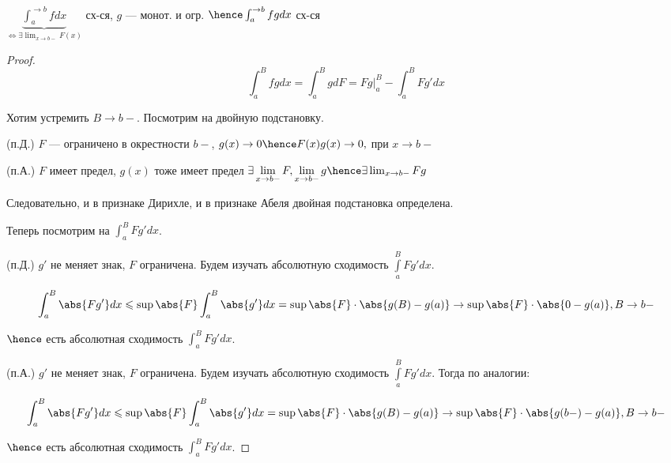 \begin{theorem}
    $\underbrace{\int_a^{\to b} f dx}_{\Leftrightarrow \exists \lim_{x \to b-} F(x)}$ сх-ся, $g$ --- монот. и огр. $\hence \int_a^{\to b} fg dx $ сх-ся
\end{theorem}


\begin{proof}
    \[
        \int_a^B fg dx = \int_a^B g dF = Fg \bigg| _a ^ B - \int_a^B F g' dx 
    \]

    Хотим устремить $B \to b-$. Посмотрим на двойную подстановку.
    
    (п.Д.) $F$ --- ограничено в окрестности $b-$, $g(x) \to 0 \hence F(x)g(x) \to 0, $ при $x \to b-$

    (п.А.) $F$ имеет предел, $g(x)$ тоже имеет предел $\exists \lim\limits_{x \to b-} F, \lim\limits_{x  \to b-} g \hence \exists \lim_{x\to b-} Fg$

    Следовательно, и в признаке Дирихле, и в признаке Абеля двойная подстановка определена.

    Теперь посмотрим на $\int_a^B Fg' dx$.

    (п.Д.) $g'$ не меняет знак, $F$ ограничена. Будем изучать абсолютную сходимость $\int\limits_a^B Fg' dx$.

    \[
        \int_a^B \abs{Fg'} dx \leqslant \sup \abs{F} \int_a^B \abs{g'} dx = \sup \abs{F} \cdot \abs{g(B) - g(a)} \to \sup \abs{F} \cdot \abs{0 - g(a)}, B \to b-
    \]

    $\hence $ есть абсолютная сходимость $\int_a^B Fg' dx$.

    (п.А.) $g'$ не меняет знак, $F$ ограничена. Будем изучать абсолютную сходимость $\int\limits_a^B Fg' dx$. 
    Тогда по аналогии:

    \[
        \int_a^B \abs{Fg'} dx \leqslant \sup \abs{F} \int_a^B \abs{g'} dx = \sup \abs{F} \cdot \abs{g(B) - g(a)} \to \sup \abs{F} \cdot \abs{g(b-) - g(a)}, B \to b-
    \]

    $\hence $ есть абсолютная сходимость $\int_a^B Fg' dx$.

\end{proof}


